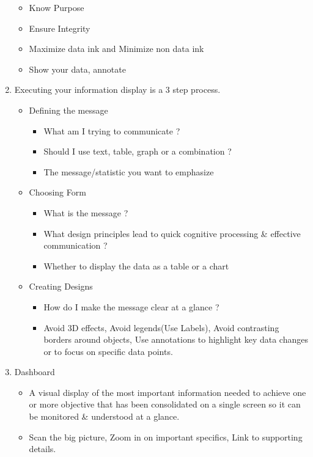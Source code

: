 \documentclass[a4paper]{article}
\begin{document}
\begin{enumerate}
		\begin{itemize}
			\item Know Purpose
			\item Ensure Integrity
			\item Maximize data ink and Minimize non data ink
			\item Show your data, annotate
		\end{itemize}
		\item Executing your information display is a 3 step process.
		\begin{itemize}
			\item Defining the message
			\begin{itemize}
				\item What am I trying to communicate ?
				\item Should I use text, table, graph or a combination ?
				\item The message/statistic you want to emphasize
			\end{itemize}
			\item Choosing Form
			\begin{itemize}
				\item What is the message ?
				\item What design principles lead to quick cognitive processing \& effective communication ?
				\item Whether to display the data as a table or a chart
			\end{itemize}
			\item Creating Designs
			\begin{itemize}
				\item How do I make the message clear at a glance ?
				\item Avoid 3D effects, Avoid legends(Use Labels), Avoid contrasting borders around objects, Use annotations to highlight key data changes or to focus on specific data points.
			\end{itemize}
		\end{itemize}
		\item Dashboard
		\begin{itemize}
		\item A visual display of the most important information needed to achieve one or more objective that has been consolidated on a single screen so it can be monitored \& understood at a glance.
			\item Scan the big picture, Zoom in on important specifics, Link to supporting details.
		\end{itemize}
	\end{enumerate}
\end{document}
